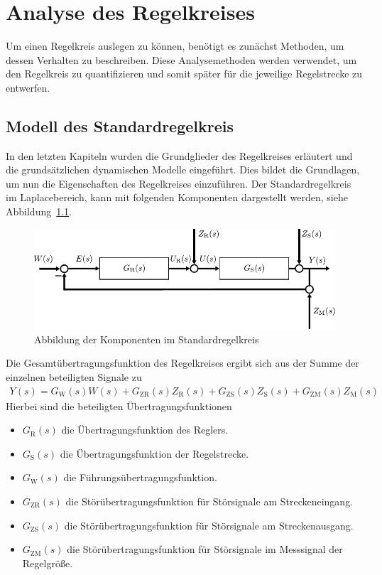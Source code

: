 \chapter{Analyse des Regelkreises}
%
Um einen Regelkreis auslegen zu können, benötigt es zunächst Methoden, um dessen Verhalten zu beschreiben. Diese Analysemethoden werden verwendet, um den Regelkreis zu quantifizieren und somit später für die jeweilige Regelstrecke zu entwerfen.
%
\section{Modell des Standardregelkreis \cite{MSF05,Lunze10}}
\label{sec:standardregelkreis}
%
In den letzten Kapiteln wurden die Grundglieder des Regelkreises erläutert und die grundsätzlichen dynamischen Modelle eingeführt. Dies bildet die Grundlagen, um nun die Eigenschaften des Regelkreises einzuführen. Der Standardregelkreis im Laplacebereich, kann mit folgenden Komponenten dargestellt werden, siehe Abbildung~\ref{fig:standardRegelkr}.
%
\begin{figure}[h!]
	\centering
	\includegraphics[width=0.95\linewidth]{Abbildungen/Systemanalyse/PDF/Standardregelkreis.pdf}
	\caption{Abbildung der Komponenten im Standardregelkreis}
	\label{fig:standardRegelkr}
\end{figure}
%
Die Gesamtübertragungsfunktion des Regelkreises ergibt sich aus der Summe der einzelnen beteiligten Signale zu 
%
\begin{equation*}
\begin{aligned}
	Y(s)=G_{\text{W}}(s)W(s)+G_{\text{ZR}}(s)Z_{\text{R}}(s)+G_{\text{ZS}}(s)Z_{\text{S}}(s)+G_{\text{ZM}}(s)Z_{\text{M}}(s)
\end{aligned}
\end{equation*}  
%
Hierbei sind die beteiligten Übertragungsfunktionen
%
\begin{itemize}
	\item $G_{\text{R}}(s)$ die Übertragungsfunktion des Reglers.
	\item $G_{\text{S}}(s)$ die Übertragungsfunktion der Regelstrecke.
	\item $G_{\text{W}}(s)$ die Führungsübertragungsfunktion.
	\item $G_{\text{ZR}}(s)$ die Störübertragungsfunktion für Störsignale am Streckeneingang.
	\item $G_{\text{ZS}}(s)$ die Störübertragungsfunktion für Störsignale am Streckenausgang.
	\item $G_{\text{ZM}}(s)$ die Störübertragungsfunktion für Störsignale im Messsignal der Regelgröße.
\end{itemize}  
